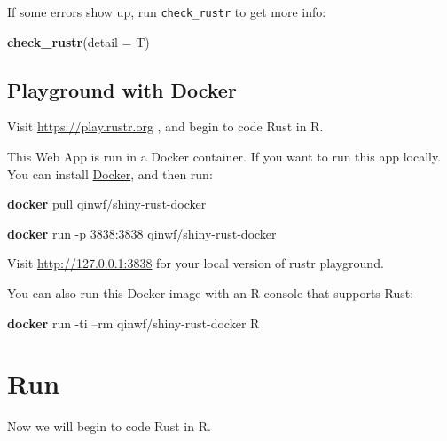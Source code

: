 \documentclass[]{book}
\newenvironment{Shaded}{\begin{snugshade}}{\end{snugshade}}
\newcommand{\KeywordTok}[1]{\textcolor[rgb]{0.13,0.29,0.53}{\textbf{{#1}}}}
\newcommand{\DataTypeTok}[1]{\textcolor[rgb]{0.13,0.29,0.53}{{#1}}}
\newcommand{\NormalTok}[1]{{#1}}
\begin{document}
If some errors show up, run \texttt{check\_rustr} to get more info:

\begin{Shaded}
\begin{Highlighting}[]
\KeywordTok{check_rustr}\NormalTok{(}\DataTypeTok{detail =} \NormalTok{T)}
\end{Highlighting}
\end{Shaded}

\section{Playground with Docker}\label{playground-with-docker}

Visit \url{https://play.rustr.org} , and begin to code Rust in R.

This Web App is run in a Docker container. If you want to run this app
locally. You can install
\href{https://docs.docker.com/windows/}{Docker}, and then run:

\begin{Shaded}
\begin{Highlighting}[]
\KeywordTok{docker} \NormalTok{pull qinwf/shiny-rust-docker}

\KeywordTok{docker} \NormalTok{run -p 3838:3838 qinwf/shiny-rust-docker}
\end{Highlighting}
\end{Shaded}

Visit \url{http://127.0.0.1:3838} for your local version of rustr
playground.

You can also run this Docker image with an R console that supports Rust:

\begin{Shaded}
\begin{Highlighting}[]
\KeywordTok{docker} \NormalTok{run -ti --rm qinwf/shiny-rust-docker R}
\end{Highlighting}
\end{Shaded}

\chapter{Run}\label{run}

Now we will begin to code Rust in R.
\end{document}
